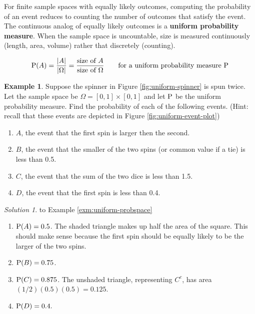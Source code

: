 \documentclass[
]{book}
\providecommand{\tightlist}{%
  \setlength{\itemsep}{0pt}\setlength{\parskip}{0pt}}
\theoremstyle{definition}
\theoremstyle{definition}
\newtheorem{example}{Example}[chapter]
\theoremstyle{definition}
\theoremstyle{remark}
\newtheorem*{solution}{Solution}
\begin{document}
For finite sample spaces with equally likely outcomes, computing the probability of an event reduces to counting the number of outcomes that satisfy the event. The continuous analog of equally likely outcomes is a \textbf{uniform probability measure}. When the sample space is uncountable, size is measured continuously (length, area, volume) rather that discretely (counting).

\[
\textrm{P}(A) = \frac{|A|}{|\Omega|} = \frac{\text{size of } A}{\text{size of } \Omega} \qquad \text{for a uniform probability measure $\textrm{P}$}
\]

\begin{example}
\protect\hypertarget{exm:uniform-probspace}{}{\label{exm:uniform-probspace} }
Suppose the spinner in Figure \ref{fig:uniform-spinner} is spun twice. Let the sample space be \(\Omega = [0,1]\times [0,1]\) and let \(\textrm{P}\) be the uniform probability measure. Find the probability of each of the following events. (Hint: recall that these events are depicted in Figure \ref{fig:uniform-event-plot})
\end{example}

\begin{enumerate}
\def\labelenumi{\arabic{enumi}.}
\tightlist
\item
  \(A\), the event that the first spin is larger then the second.
\item
  \(B\), the event that the smaller of the two spins (or common value if a tie) is less than 0.5.
\item
  \(C\), the event that the sum of the two dice is less than 1.5.
\item
  \(D\), the event that the first spin is less than 0.4.
\end{enumerate}

\begin{solution}
{}
to Example \ref{exm:uniform-probspace}
\end{solution}

\begin{enumerate}
\def\labelenumi{\arabic{enumi}.}
\tightlist
\item
  \(\textrm{P}(A) = 0.5\). The shaded triangle makes up half the area of the square. This should make sense because the first spin should be equally likely to be the larger of the two spins.\\
\item
  \(\textrm{P}(B) = 0.75\).
\item
  \(\textrm{P}(C)=0.875\). The unshaded triangle, representing \(C^c\), has area \((1/2)(0.5)(0.5) = 0.125\).
\item
  \(\textrm{P}(D) = 0.4.\)
\end{enumerate}
\end{document}
